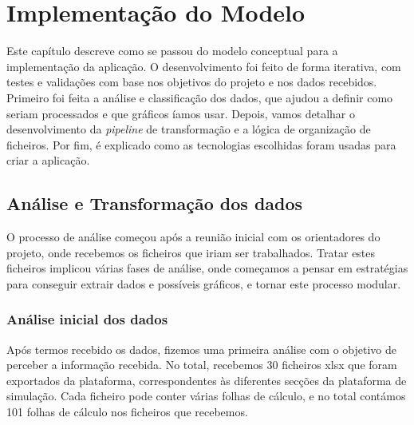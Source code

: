 

\chapter{Implementação do Modelo}
\label{ch:implementacaoDoModelo}

Este capítulo descreve como se passou do modelo conceptual para a implementação da aplicação. O desenvolvimento foi feito de forma iterativa, com testes e validações com base nos objetivos do projeto e nos dados recebidos. Primeiro foi feita a análise e classificação dos dados, que ajudou a definir como seriam processados e que gráficos íamos usar. Depois, vamos detalhar o desenvolvimento da \textit{pipeline} de transformação e a lógica de organização de ficheiros. Por fim, é explicado como as tecnologias escolhidas foram usadas para criar a aplicação.

\section{Análise e Transformação dos dados}

O processo de análise começou após a reunião inicial com os orientadores do projeto, onde recebemos os ficheiros que iriam ser trabalhados. Tratar estes ficheiros implicou várias fases de análise, onde começamos a pensar em estratégias para conseguir extrair dados e possíveis gráficos, e tornar este processo modular.

\subsection{Análise inicial dos dados}
\label{sec:analiseInicial}

Após termos recebido os dados, fizemos uma primeira análise com o objetivo de perceber a informação recebida. No total, recebemos 30 ficheiros \gls{xlsx} que foram exportados da plataforma, correspondentes às diferentes secções da plataforma de simulação. Cada ficheiro pode conter várias folhas de cálculo, e no total contámos 101 folhas de cálculo nos ficheiros que recebemos.


